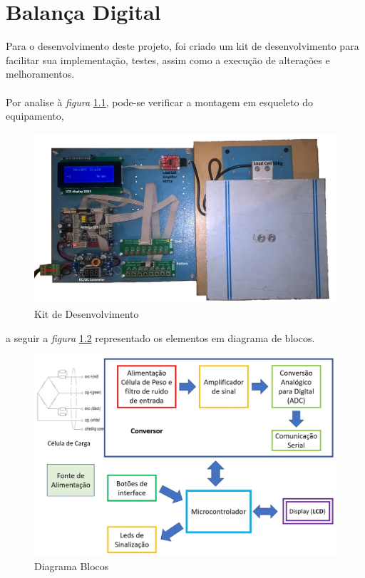 \chapter{Balança Digital}
Para o desenvolvimento deste projeto, foi criado um kit de desenvolvimento para facilitar sua implementação, testes, assim como a execução de alterações e melhoramentos.
\\
\\
Por analise à \textit{figura} \ref{Kit_Desenvolvimento_2}, pode-se verificar a montagem em esqueleto do equipamento,
\begin{figure}[H]
	\centering
	\includegraphics[scale=0.12]{./image/PESTA/kit/Kit_Desenvolvimento_2.jpg}
	\caption{Kit de Desenvolvimento}
	\label{Kit_Desenvolvimento_2}
\end{figure}
a seguir a \textit{figura} \ref{Block_diagram_1} representado os elementos em diagrama de blocos.
\begin{figure}[H]
	\centering
	\includegraphics[scale=0.27]{./image/PESTA/Diagrama/Diagrama_bloco_3.jpg}
	\caption{Diagrama Blocos}
	\label{Block_diagram_1}
\end{figure}
